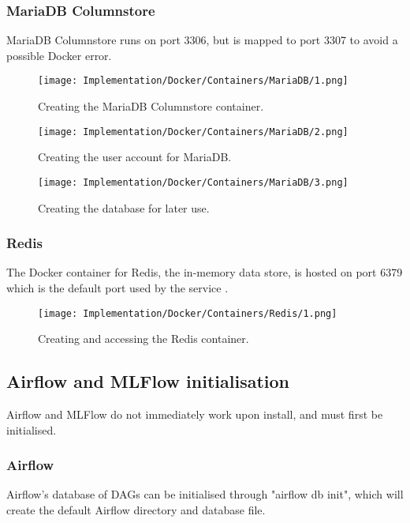 \pagebreak 
\subsubsection{MariaDB Columnstore}
MariaDB Columnstore runs on port 3306, but is mapped to port 3307 to avoid a possible Docker error.

\begin{figure}[H]
    \centering
    \texttt{[image: Implementation/Docker/Containers/MariaDB/1.png]}
    \caption{Creating the MariaDB Columnstore container.}
    \label{fig:CreateMCS}
\end{figure}

\begin{figure}[H]
    \centering
    \texttt{[image: Implementation/Docker/Containers/MariaDB/2.png]}
    \caption{Creating the user account for MariaDB.}
    \label{fig:CreateMCSUser}
\end{figure}

\begin{figure}[H]
    \centering
    \texttt{[image: Implementation/Docker/Containers/MariaDB/3.png]}
    \caption{Creating the database for later use.}
    \label{fig:CreateDB}
\end{figure}

\pagebreak 
\subsubsection{Redis}
The Docker container for Redis, the in-memory data store, is hosted on port 6379 which is the default port used by 
the service \autocite{stream_security_security_nodate}.  

\begin{figure}[H]
    \centering
    \texttt{[image: Implementation/Docker/Containers/Redis/1.png]}
    \caption{Creating and accessing the Redis container.}
    \label{fig:CreateRedis}
\end{figure}


\subsection{Airflow and MLFlow initialisation}
Airflow and MLFlow do not immediately work upon install, and must first be initialised.

\subsubsection{Airflow}
Airflow's database of DAGs can be initialised through "airflow db init", which will create 
the default Airflow directory and database file.

